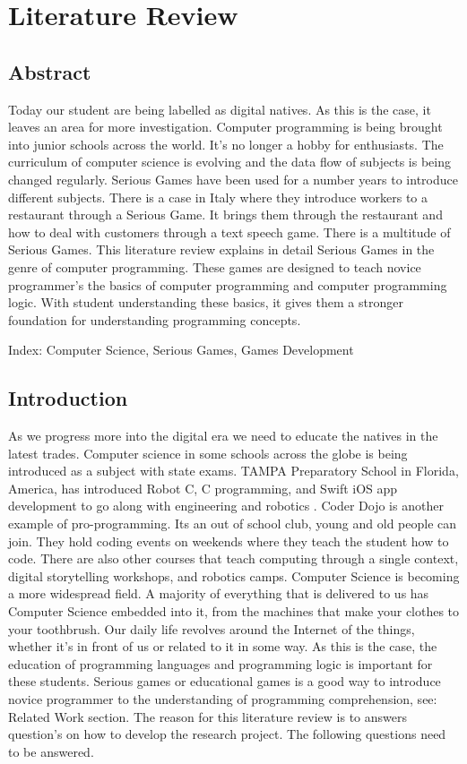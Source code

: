\chapter{Literature Review}


\section{Abstract}
Today our student are being labelled as digital natives. As this is the case, it leaves an area for more investigation. Computer programming is being brought into junior schools across the world. It's no longer a hobby for enthusiasts. The curriculum of computer science is evolving and the data flow of subjects is being changed regularly. Serious Games have been used for a number years to introduce different subjects. There is a case in Italy where they introduce workers to a restaurant through a Serious Game. It brings them through the restaurant and how to deal with customers through a text speech game. There is a multitude of Serious Games. This literature review explains in detail Serious Games in the genre of computer programming. These games are designed to teach novice programmer's the basics of computer programming and computer programming logic. With student understanding these basics, it gives them a stronger foundation for understanding programming concepts.

Index: Computer Science, Serious Games, Games Development

\section{Introduction}
As we progress more into the digital era we need to educate the natives in the latest trades. Computer science in some schools across the globe is being introduced as a subject with state exams. TAMPA Preparatory School in Florida, America, has introduced Robot C, C programming, and Swift iOS app development to go along with engineering and robotics \cite{thompson2017coding}. Coder Dojo is another example of pro-programming. Its an out of school club, young and old people can join. They hold coding events on weekends where they teach the student how to code. There are also other courses that teach computing through a single context, digital storytelling workshops, and robotics camps. Computer Science is becoming a more widespread field. A majority of everything that is delivered to us has Computer Science embedded into it, from the machines that make your clothes to your toothbrush. Our daily life revolves around the Internet of the things, whether it's in front of us or related to it in some way. As this is the case, the education of programming languages and programming logic is important for these students. Serious games or educational games is a good way to introduce novice programmer to the understanding of programming comprehension, see: Related Work section.
The reason for this literature review is to answers question's on how to develop the research project. The following questions need to be answered.

